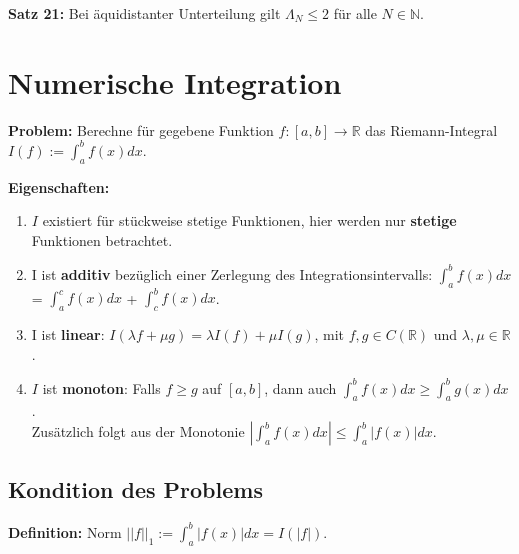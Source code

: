 \documentclass[a4paper]{article}
\begin{document}
\vspace{1em}

\textbf{Satz 21:} Bei äquidistanter Unterteilung gilt $\Lambda_N \le 2$ für alle
$N \in \mathbb{N}$.

\section{Numerische Integration}

\textbf{Problem:} Berechne für gegebene Funktion $f: [a, b] \to \mathbb{R}$ das
Riemann-Integral $I(f) := \int_a^b f(x) dx$.

\textbf{Eigenschaften:}
\begin{enumerate}
    \item $I$ existiert für stückweise stetige Funktionen, hier werden nur
    \textbf{stetige} Funktionen betrachtet.
    \item I ist \textbf{additiv} bezüglich einer Zerlegung des
    Integrationsintervalls: $\int_a^b f(x) dx$ = $\int_a^c f(x) dx$ + $\int_c^b
    f(x) dx$.
    \item I ist \textbf{linear}:
    $I(\lambda f + \mu g) = \lambda I(f) + \mu I(g)$, mit $f, g \in
    C(\mathbb{R})$ und $\lambda, \mu \in \mathbb{R}$.
    \item $I$ ist \textbf{monoton}: Falls $f \ge g$ auf $[a, b]$, dann auch
    $\int_a^b f(x) dx \ge \int_a^b g(x) dx$.
    \\
    Zusätzlich folgt aus der Monotonie
    $|\int_a^b f(x) dx| \le \int_a^b |f(x)| dx$.
\end{enumerate}

\subsection{Kondition des Problems}

\textbf{Definition:} Norm $||f||_1 := \int_a^b |f(x)| dx = I(|f|)$.
\end{document}

